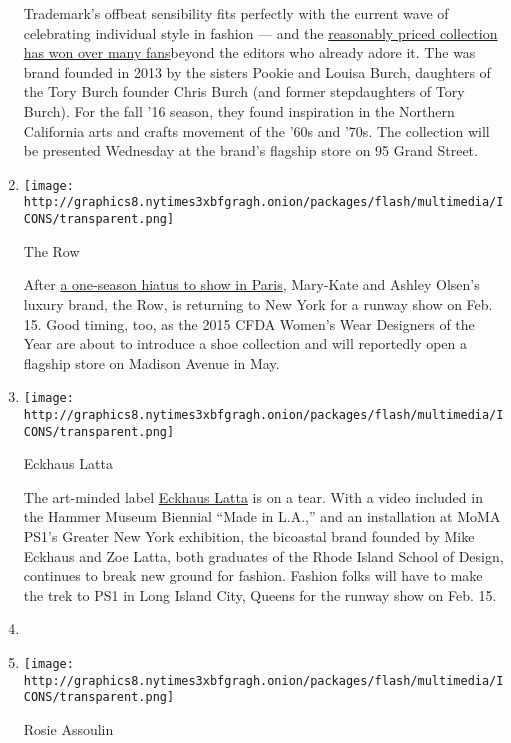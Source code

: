 \begin{enumerate}
  Trademark's offbeat sensibility fits perfectly with the current wave
  of celebrating individual style in fashion --- and the
  \href{http://www.vogue.com/fashion-shows/spring-2016-ready-to-wear/trademark}{reasonably
  priced collection has won over many fans}beyond the editors who
  already adore it. The was brand founded in 2013 by the sisters Pookie
  and Louisa Burch, daughters of the Tory Burch founder Chris Burch (and
  former stepdaughters of Tory Burch). For the fall '16 season, they
  found inspiration in the Northern California arts and crafts movement
  of the '60s and '70s. The collection will be presented Wednesday at
  the brand's flagship store on 95 Grand Street.
\item
  \texttt{[image: http://graphics8.nytimes3xbfgragh.onion/packages/flash/multimedia/ICONS/transparent.png]}

  The Row

  After
  \href{http://www.nytimes3xbfgragh.onion/2015/09/29/fashion/the-real-story-behind-the-olsens-move-of-the-row-to-paris-fashion-week.html?_r=0}{a
  one-season hiatus to show in Paris}, Mary-Kate and Ashley Olsen's
  luxury brand, the Row, is returning to New York for a runway show on
  Feb. 15. Good timing, too, as the 2015 CFDA Women's Wear Designers of
  the Year are about to introduce a shoe collection and will reportedly
  open a flagship store on Madison Avenue in May.
\item
  \texttt{[image: http://graphics8.nytimes3xbfgragh.onion/packages/flash/multimedia/ICONS/transparent.png]}

  Eckhaus Latta

  The art-minded label \href{http://eckhauslatta.com/}{Eckhaus Latta} is
  on a tear. With a video included in the Hammer Museum Biennial ``Made
  in L.A.,'' and an installation at MoMA PS1's Greater New York
  exhibition, the bicoastal brand founded by Mike Eckhaus and Zoe Latta,
  both graduates of the Rhode Island School of Design, continues to
  break new ground for fashion. Fashion folks will have to make the trek
  to PS1 in Long Island City, Queens for the runway show on Feb. 15.
\item
\item
  \texttt{[image: http://graphics8.nytimes3xbfgragh.onion/packages/flash/multimedia/ICONS/transparent.png]}

  Rosie Assoulin


\end{enumerate}

